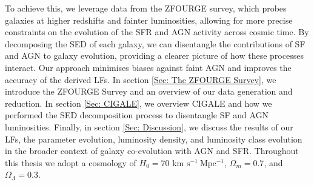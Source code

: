 To achieve this, we leverage data from the ZFOURGE survey, which probes galaxies at higher redshifts and fainter luminosities, allowing for more precise constraints on the evolution of the SFR and AGN activity across cosmic time. By decomposing the SED of each galaxy, we can disentangle the contributions of SF and AGN to galaxy evolution, providing a clearer picture of how these processes interact. Our approach minimises biases against faint AGN and improves the accuracy of the derived LFs. In section \ref{Sec: The ZFOURGE Survey}, we introduce the ZFOURGE Survey and an overview of our data generation and reduction. In section \ref{Sec: CIGALE}, we overview CIGALE and how we performed the SED decomposition process to disentangle SF and AGN luminosities. Finally, in section \ref{Sec: Discussion}, we discuss the results of our LFs, the parameter evolution, luminosity density, and luminosity class evolution in the broader context of galaxy co-evolution with AGN and SFR. Throughout this thesis we adopt a cosmology of $H_0 = 70$ km $\mathrm{s^{-1}\ Mpc^{-1}}$, $\Omega_m=0.7$, and $\Omega_\Lambda=0.3$.